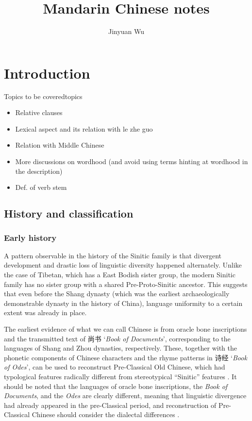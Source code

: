 \documentclass[UTF8, a4paper, oneside, scheme=plain, 12pt]{ctexrep}
\title{Mandarin Chinese notes}
\author{Jinyuan Wu}
\newcommand*{\citepages}[1]{pp.~{#1}}
\newcommand{\work}[1]{\textit{#1}}
\newcommand{\translate}[1]{`#1'}
\begin{document}
\automath

\maketitle

\chapter{Introduction}

\begin{todobox}{Topics to be covered}{topics}
    \begin{itemize}
        \item Relative clauses 
        \item Lexical aspect and its relation with le zhe guo
        \item Relation with Middle Chinese
        \item More discussions on wordhood (and avoid using terms hinting at wordhood in the description)
        \item Def. of verb stem
    \end{itemize}
\end{todobox}

\section{History and classification}

\subsection{Early history}

A pattern observable in the history of the Sinitic family is that divergent development and drastic loss of linguistic diversity happened alternately.
Unlike the case of Tibetan, which has a East Bodish sister group,
the modern Sinitic family has no sister group with a shared Pre-Proto-Sinitic ancestor.
This suggests that even before the Shang dynasty (which was the earliest archaeologically demonstrable dynasty in the history of China),
language uniformity to a certain extent was already in place.

The earliest evidence of what we can call Chinese is from 
oracle bone inscriptions and the transmitted text of 尚书 \translate{\work{Book of Documents}},
corresponding to the languages of Shang and Zhou dynasties, respectively.
These, together with the phonetic components of Chinese characters
and the rhyme patterns in 诗经 \translate{\work{Book of Odes}},
can be used to reconstruct Pre-Classical Old Chinese,
which had typological features radically different from stereotypical ``Sinitic'' features
\citep{baxter2014old}.
It should be noted that the languages of oracle bone inscriptions,
the \work{Book of Documents}, and the \work{Odes} are clearly different,
meaning that linguistic divergence had already appeared in the pre-Classical period,
and reconstruction of Pre-Classical Chinese should consider the dialectal differences
\citep[\citepages{478-9}]{harbsmeier2016irrefutable}.
\end{document}
